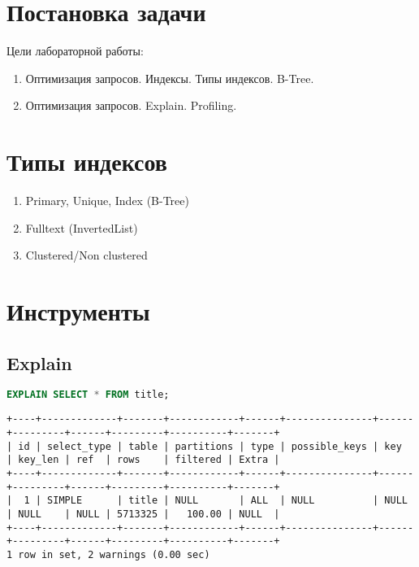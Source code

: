 \documentclass[12pt,a4paper]{article}
\begin{document}
\section{Постановка задачи}
Цели лабораторной работы:
\begin{enumerate}
    \item Оптимизация запросов. Индексы. Типы индексов. B-Tree.
    \item Оптимизация запросов. Explain. Profiling.
\end{enumerate}
\section{Типы индексов}
\begin{enumerate}
    \item Primary, Unique, Index (B-Tree) 
    \item Fulltext (InvertedList)
    \item Clustered/Non clustered
\end{enumerate}
\section{Инструменты}
\subsection{Explain}

\begin{lstlisting}[language=SQL]
EXPLAIN SELECT * FROM title; 
\end{lstlisting}
\begin{lstlisting}[basicstyle = \tiny\ttfamily, columns = fixed]
+----+-------------+-------+------------+------+---------------+------+---------+------+---------+----------+-------+
| id | select_type | table | partitions | type | possible_keys | key  | key_len | ref  | rows    | filtered | Extra |
+----+-------------+-------+------------+------+---------------+------+---------+------+---------+----------+-------+
|  1 | SIMPLE      | title | NULL       | ALL  | NULL          | NULL | NULL    | NULL | 5713325 |   100.00 | NULL  |
+----+-------------+-------+------------+------+---------------+------+---------+------+---------+----------+-------+
1 row in set, 2 warnings (0.00 sec)
\end{lstlisting}
\end{document}
